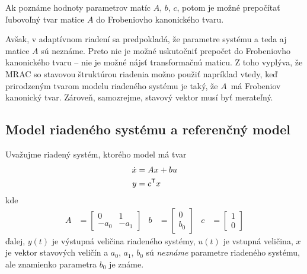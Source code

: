 \documentclass[a4paper, 10pt, ]{article}
\begin{document}
Ak poznáme hodnoty parametrov matíc $A$, $b$, $c$, potom je možné prepočítať ľubovoľný tvar matice $A$ do Frobeniovho kanonického tvaru.

Avšak, v adaptívnom riadení sa predpokladá, že parametre systému a teda aj matice $A$ sú neznáme. Preto nie je možné uskutočniť prepočet do Frobeniovho kanonického tvaru -- nie je možné nájsť transformačnú maticu. Z toho vyplýva, že MRAC so stavovou štruktúrou riadenia možno použiť napríklad vtedy, keď prirodzeným tvarom modelu riadeného systému je taký, že $A$~má Frobeniov kanonický tvar. Zároveň, samozrejme, stavový vektor musí byť merateľný.



\subsection{Model riadeného systému a referenčný model}

Uvažujme riadený systém, ktorého model má tvar
\begin{subequations} \label{sustavavSS2r_2}
    \begin{align}
        \dot x &= A x + b u \\
        y &= c^{\mathsf{T}} x
    \end{align}
\end{subequations}
kde
\begin{align*}
    A &= \begin{bmatrix} 0 & 1 \\ -a_0 & -a_1 \end{bmatrix}
    &
    b &= \begin{bmatrix} 0 \\ b_0 \end{bmatrix}
    &
    c &= \begin{bmatrix} 1 \\ 0 \end{bmatrix}
\end{align*}
ďalej, $y(t)$ je výstupná veličina riadeného systémy, $u(t)$ je vstupná veličina, $x$ je vektor stavových veličín a $a_0$, $a_1$, $b_0$ sú \emph{neznáme} parametre riadeného systému, ale znamienko parametra $b_0$ je známe.
\end{document}
